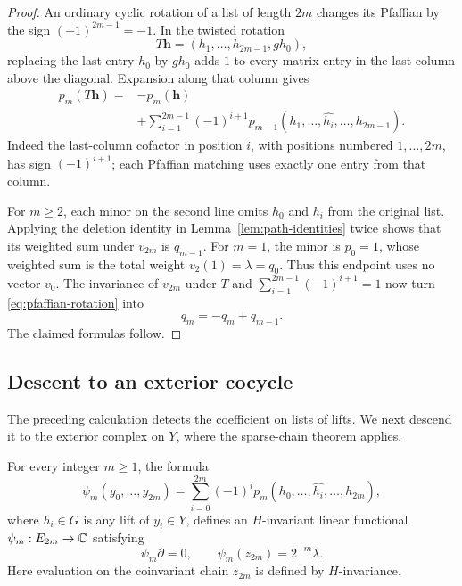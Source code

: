 \begin{proof}
An ordinary cyclic rotation of a list of length $2m$ changes its Pfaffian
by the sign $(-1)^{2m-1}=-1$.  In the twisted rotation
\[
 T\mathbf h=(h_1,\ldots,h_{2m-1},g h_0),
\]
replacing the last entry $h_0$ by $g h_0$ adds $1$ to every matrix entry in
the last column above the diagonal.  Expansion along that column gives
\begin{equation}\label{eq:pfaffian-rotation}
 \begin{split}
 p_m(T\mathbf h)
   ={}&-p_m(\mathbf h)\\
     &+\sum_{i=1}^{2m-1}(-1)^{i+1}
       p_{m-1}(h_1,\ldots,\widehat{h_i},\ldots,h_{2m-1}).
 \end{split}
\end{equation}
Indeed the last-column cofactor in position $i$, with positions numbered
$1,\ldots,2m$, has sign $(-1)^{i+1}$; each Pfaffian matching uses exactly
one entry from that column.

For $m\ge2$, each minor on the second line omits $h_0$ and $h_i$ from the
original list.  Applying the deletion identity in
Lemma~\ref{lem:path-identities} twice shows that its weighted sum under
$v_{2m}$ is $q_{m-1}$.  For $m=1$, the minor is $p_0=1$, whose weighted sum
is the total weight $v_2(1)=\lambda=q_0$.  Thus this endpoint uses no vector
$v_0$.  The invariance of $v_{2m}$ under $T$ and
$\sum_{i=1}^{2m-1}(-1)^{i+1}=1$ now turn
\eqref{eq:pfaffian-rotation} into
\[
 q_m=-q_m+q_{m-1}.
\]
The claimed formulas follow.
\end{proof}

\subsection{Descent to an exterior cocycle}

The preceding calculation detects the coefficient on lists of lifts.
We next descend it to the exterior complex on $Y$, where the sparse-chain
theorem applies.

\begin{proposition}\label{prop:detector}
For every integer $m\ge1$, the formula
\begin{equation}\label{eq:detector-formula}
 \psi_m(y_0,\ldots,y_{2m})
   =\sum_{i=0}^{2m}(-1)^i
       p_m(h_0,\ldots,\widehat{h_i},\ldots,h_{2m}),
\end{equation}
where $h_i\in G$ is any lift of $y_i\in Y$, defines an $H$-invariant
linear functional $\psi_m:E_{2m}\to\mathbb C$ satisfying
\[
 \psi_m\partial=0,\qquad
 \psi_m(z_{2m})=2^{-m}\lambda.
\]
Here evaluation on the coinvariant chain $z_{2m}$ is defined by
$H$-invariance.
\end{proposition}

